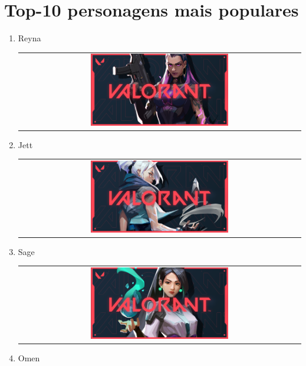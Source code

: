 \documentclass[a4paper, 12pt]{article}
\begin{document}
\section{Top-10 personagens mais populares}
\begin{enumerate}
    \item Reyna
    \begin{figure}[H]
        \centering
    \end{figure}
    \begin{tabular}{c}
    \includegraphics[width=0.5\textwidth]
    {Reyna.png}
    \end{tabular}
    \item Jett
    \begin{figure}[H]
        \centering
    \end{figure}
    \begin{tabular}{c}
    \includegraphics[width=0.5\textwidth]
    {Jett.png}
    \end{tabular}
    \item Sage
    \begin{figure}[H]
        \centering
    \end{figure}
    \begin{tabular}{c}
    \includegraphics[width=0.5\textwidth]
    {Sage.png}
    \end{tabular}
    \item Omen
    \begin{figure}[H]

\end{figure}
\end{enumerate}
\end{document}
